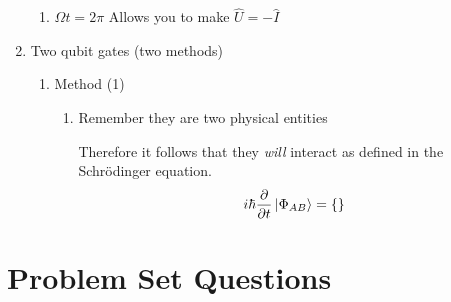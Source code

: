 \documentclass[reprint, amsmath,amssymb, aps]{revtex4-2}
\begin{document}
\begin{enumerate}
\begin{enumerate}
                    \item $\Omega t = 2\pi$ Allows you to make $\hat{U} = -\hat{I}$
                \end{enumerate}
                \item Two qubit gates (two methods)
                \begin{enumerate}
                    \item Method (1)
                    \begin{enumerate}
                        \item Remember they are two physical entities
                        \begin{figure}
                        \end{figure}
                        Therefore it follows that they \textit{will} interact as defined in the Schr{\"o}dinger equation.
                        \begin{equation*}
                            i\hbar\pdv{}{t}\ket{\Phi_{AB}} = \{\}
                        \end{equation*}
                    \end{enumerate}
                \end{enumerate}
            \end{enumerate}
            
            
            

    \section{Problem Set Questions}
\end{document}
